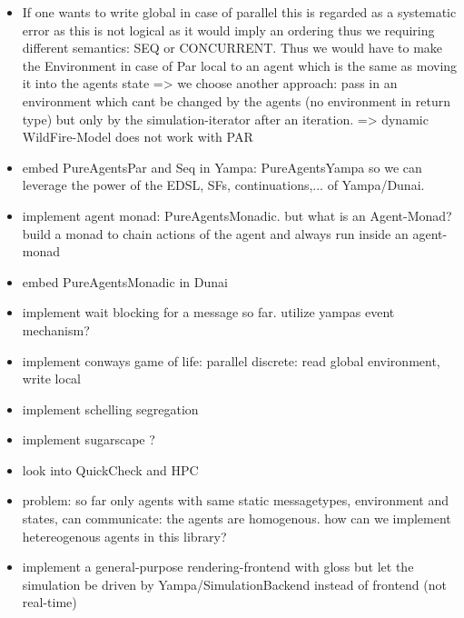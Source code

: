 \begin{itemize}
\item If one wants to write global in case of parallel this is regarded as a systematic error as this is not logical as it would imply an ordering thus we requiring different semantics: SEQ or CONCURRENT. Thus we would have to make the Environment in case of Par local to an agent which is the same as moving it into the agents state => we choose another approach: pass in an environment which cant be changed by the agents (no environment in return type) but only by the simulation-iterator after an iteration.  => dynamic WildFire-Model does not work with PAR



\item embed PureAgentsPar and Seq in Yampa: PureAgentsYampa so we can leverage the power of the EDSL, SFs, continuations,... of Yampa/Dunai.
\item implement agent monad: PureAgentsMonadic. but what is an Agent-Monad? build a monad to chain actions of the agent and always run inside an agent-monad
\item embed PureAgentsMonadic in Dunai

\item implement wait blocking for a message so far. utilize yampas event mechanism?

\item implement conways game of life: parallel discrete: read global environment, write local
\item implement schelling segregation
\item implement sugarscape ?


\item look into QuickCheck and HPC
\item problem: so far only agents with same static messagetypes, environment and states, can communicate: the agents are homogenous. how can we implement hetereogenous agents in this library?
\item implement a general-purpose rendering-frontend with gloss but let the simulation be driven by Yampa/SimulationBackend instead of frontend (not real-time)



\end{itemize}
